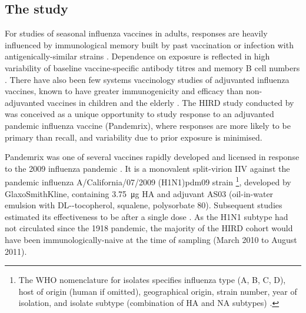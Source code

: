 \subsection{The  study}

For studies of seasonal influenza vaccines in adults, responses are heavily influenced by immunological memory built by past vaccination or infection with antigenically-similar strains \autocite{nakaya2012SystemsVaccinologyLearning,sobolev2016AdjuvantedInfluenzaH1N1Vaccination}.
Dependence on exposure is reflected in high variability of baseline vaccine-specific antibody titres and memory B cell numbers \autocite{tsang2014GlobalAnalysesHuman}.
There have also been few systems vaccinology studies of adjuvanted influenza vaccines, known to have greater immunogenicity and efficacy than non-adjuvanted vaccines in children and the elderly \autocite{nakaya2016SystemsBiologyImmunity, wilkins2017AS03MF59AdjuvantedInfluenza,tregoning2018AdjuvantedInfluenzaVaccines}.
The \gls{HIRD} study conducted by \textcite{sobolev2016AdjuvantedInfluenzaH1N1Vaccination} was conceived 
as a unique opportunity to study response to an adjuvanted pandemic influenza vaccine (Pandemrix),
where responses are more likely to be primary than recall,
and variability due to prior exposure is minimised.

Pandemrix was one of several vaccines rapidly developed and licensed in response to the 2009 influenza pandemic \autocite{broadbent2011InfluenzaVirusVaccines}.
It is a monovalent split-virion \gls{IIV} against the pandemic influenza A/California/07/2009 (H1N1)pdm09 strain%
\footnote{
    The \gls{WHO} nomenclature for isolates specifies influenza type (A, B, C, D), host of origin (human if omitted), geographical origin, strain number, year of isolation, and isolate subtype (combination of \gls{HA} and \gls{NA} subtypes) \autocite{worldhealthorganization1980RevisionSystemNomenclature}.
},
developed by GlaxoSmithKline,
containing \SI{3.75}{\micro\gram} \gls{HA}
and adjuvant AS03 (oil-in-water emulsion with DL-\textalpha-tocopherol, squalene, polysorbate 80).
Subsequent studies estimated its effectiveness to be  after a single dose \autocite{syrjanen2014EffectivenessPandemicSeasonal}.
As the H1N1 subtype had not circulated since the 1918 pandemic, the majority of the \gls{HIRD} cohort would have been immunologically-naive at the time of sampling (March 2010 to August 2011).

